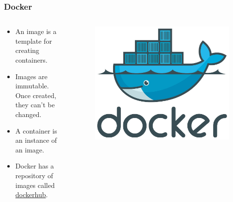 \documentclass[aspectratio=169]{beamer}
\begin{document}
\begin{frame}
    \frametitle{Docker}
    \begin{columns}
        \begin{column}{0.5\textwidth}
            \begin{itemize}
                \item An image is a template for creating containers.
                \item Images are immutable. Once created, they can't be
                    changed.
                \item A container is an instance of an image.
                \item Docker has a repository of images called 
                    \href{https://hub.docker.com/}{dockerhub}.
            \end{itemize}
        \end{column}
        \begin{column}{0.5\textwidth}
            \begin{figure}
                \centering
                \includegraphics[scale=0.5]{logos/docker-logo.jpg}
            \end{figure}
        \end{column}
    \end{columns}
\end{frame}
\end{document}
